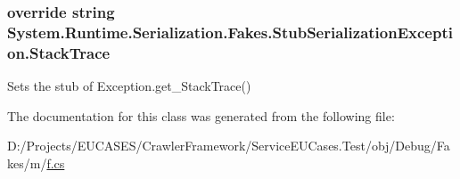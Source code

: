 \hypertarget{class_system_1_1_runtime_1_1_serialization_1_1_fakes_1_1_stub_serialization_exception_a688a98568087fe9bce140bb25a5b7adc}{
\subsubsection[{Stack\-Trace}]{\setlength{\rightskip}{0pt plus 5cm}override string System.\-Runtime.\-Serialization.\-Fakes.\-Stub\-Serialization\-Exception.\-Stack\-Trace\hspace{0.3cm}{\ttfamily [get]}}}\label{class_system_1_1_runtime_1_1_serialization_1_1_fakes_1_1_stub_serialization_exception_a688a98568087fe9bce140bb25a5b7adc}


Sets the stub of Exception.\-get\-\_\-\-Stack\-Trace()



The documentation for this class was generated from the following file\-:\begin{DoxyCompactItemize}
\item 
D\-:/\-Projects/\-E\-U\-C\-A\-S\-E\-S/\-Crawler\-Framework/\-Service\-E\-U\-Cases.\-Test/obj/\-Debug/\-Fakes/m/\hyperlink{m_2f_8cs}{f.\-cs}\end{DoxyCompactItemize}
